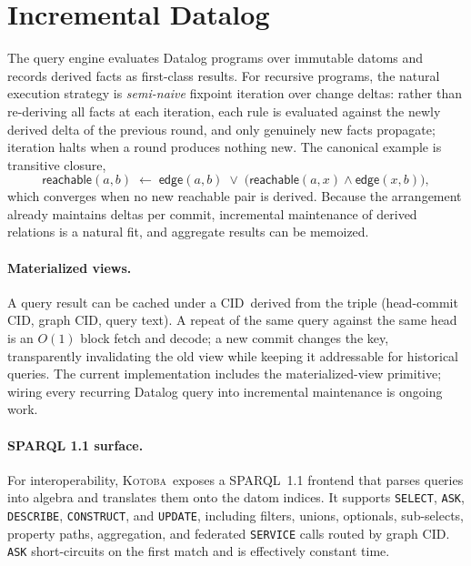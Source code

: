 \documentclass[11pt]{article}
\newcommand{\kotoba}{\textsc{Kotoba}}
\newcommand{\cid}{\textsf{CID}}
\begin{document}
\section{Incremental Datalog}
\label{sec:datalog}

The query engine evaluates Datalog programs over immutable datoms and records
derived facts as first-class results. For recursive programs, the natural
execution strategy is \emph{semi-naive} fixpoint iteration over change deltas:
rather than re-deriving all facts at each iteration, each rule is evaluated
against the newly derived delta of the previous round, and only genuinely new
facts propagate; iteration halts when a round produces nothing new. The
canonical example is transitive closure,
\[
\textsf{reachable}(a,b) \;\leftarrow\;
  \textsf{edge}(a,b)
  \;\vee\;
  \bigl(\textsf{reachable}(a,x)\wedge\textsf{edge}(x,b)\bigr),
\]
which converges when no new \textsf{reachable} pair is derived. Because the
arrangement already maintains deltas per commit, incremental maintenance of
derived relations is a natural fit, and aggregate results can be memoized.

\paragraph{Materialized views.}
A query result can be cached under a \cid\ derived from the triple (head-commit
\cid, graph \cid, query text). A repeat of the same query against the same head
is an $O(1)$ block fetch and decode; a new commit changes the key,
transparently invalidating the old view while keeping it addressable for
historical queries. The current implementation includes the materialized-view
primitive; wiring every recurring Datalog query into incremental maintenance is
ongoing work.

\paragraph{SPARQL 1.1 surface.}
For interoperability, \kotoba\ exposes a SPARQL~1.1 frontend that parses queries
into algebra and translates them onto the datom indices. It supports
\texttt{SELECT}, \texttt{ASK}, \texttt{DESCRIBE}, \texttt{CONSTRUCT}, and
\texttt{UPDATE}, including filters, unions, optionals, sub-selects, property
paths, aggregation, and federated \texttt{SERVICE} calls routed by graph \cid.
\texttt{ASK} short-circuits on the first match and is effectively constant time.
\end{document}
